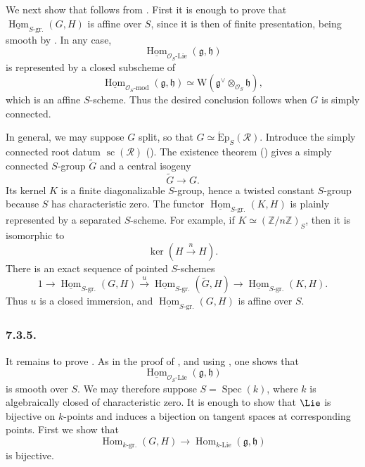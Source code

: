 We next show that  follows from . First it is enough to prove
that
\(\underline{\operatorname{Hom}}_{S\text{-}\mathrm{gr.}}(G,H)\) is
affine over \(S\), since it is then of finite presentation, being
smooth by . In any case,
\[
  \underline{\operatorname{Hom}}_{\mathcal O_S\text{-}\mathrm{Lie}}
    (\mathfrak g,\mathfrak h)
\]
is represented by a closed subscheme of
\[
  \underline{\operatorname{Hom}}_{\mathcal O_S\text{-}\mathrm{mod}}
    (\mathfrak g,\mathfrak h)
  \simeq
  \mathrm W\!\left(
    \mathfrak g^\vee\otimes_{\mathcal O_S}\mathfrak h
  \right),
\]
which is an affine \(S\)-scheme. Thus the desired conclusion follows
when \(G\) is simply connected.

In general, we may suppose \(G\) split, so that
\(G\simeq\operatorname{\acute Ep}_S(\mathscr R)\). Introduce the
simply connected root datum \(\operatorname{sc}(\mathscr R)\)
(). The existence theorem () gives a
simply connected \(S\)-group \(\widetilde G\) and a central isogeny
\[
  \widetilde G\longrightarrow G.
\]
Its kernel \(K\) is a finite diagonalizable \(S\)-group, hence a
twisted constant \(S\)-group because \(S\) has characteristic zero.
The functor
\(\underline{\operatorname{Hom}}_{S\text{-}\mathrm{gr.}}(K,H)\) is
plainly represented by a separated \(S\)-scheme. For example, if
\(K\simeq(\mathbb Z/n\mathbb Z)_S\), then it is isomorphic to
\[
  \ker\!\left(H\xrightarrow{\,n\,}H\right).
\]
There is an exact sequence of pointed \(S\)-schemes
\[
  1\longrightarrow
  \underline{\operatorname{Hom}}_{S\text{-}\mathrm{gr.}}(G,H)
  \xrightarrow{u}
  \underline{\operatorname{Hom}}_{S\text{-}\mathrm{gr.}}
    (\widetilde G,H)
  \longrightarrow
  \underline{\operatorname{Hom}}_{S\text{-}\mathrm{gr.}}(K,H).
\]
Thus \(u\) is a closed immersion, and
\(\underline{\operatorname{Hom}}_{S\text{-}\mathrm{gr.}}(G,H)\) is
affine over \(S\).

\subsubsection*{7.3.5.}

It remains to prove . As in the proof of , and using ,
one shows that
\[
  \underline{\operatorname{Hom}}_{\mathcal O_S\text{-}\mathrm{Lie}}
    (\mathfrak g,\mathfrak h)
\]
is smooth over \(S\). We may therefore suppose
\(S=\operatorname{Spec}(k)\), where \(k\) is algebraically closed of
characteristic zero. It is enough to show that \(\Lie\) is bijective
on \(k\)-points and induces a bijection on tangent spaces at
corresponding points. First we show that
\[
  \operatorname{Hom}_{k\text{-}\mathrm{gr.}}(G,H)
  \longrightarrow
  \operatorname{Hom}_{k\text{-}\mathrm{Lie}}
    (\mathfrak g,\mathfrak h)
\]
is bijective.

